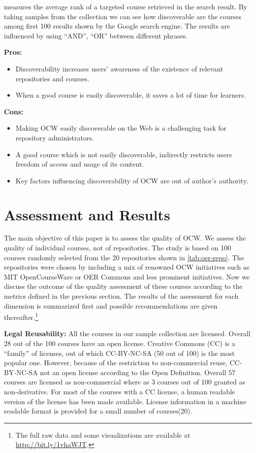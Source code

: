 \documentclass{sig-alternate}
\theoremstyle{definition}
\begin{document}
 measures the average rank of a targeted course retrieved in the search result.
By taking samples from the collection we can see how discoverable are the courses among first 100 results shown by the Google search engine.
The results are influenced by using ``AND'', ``OR'' between different phrases.

\noindent\textbf{Pros:}
\begin{itemize}
\item Discoverability increases users' awareness of the existence of relevant repositories and courses.
\item When a good course is easily discoverable, it saves a lot of time for learners.
\end{itemize}
\noindent\textbf{Cons:}
\begin{itemize}
\item Making OCW easily discoverable on the Web is a challenging task for repository administrators.
\item A good course which is not easily discoverable, indirectly restricts users freedom of access and usage of its content.
\item Key factors influencing discoverability of OCW are out of author's authority.
\end{itemize}

\noindent\section{Assessment and Results}
\label{sec:assessment-results}
The main objective of this paper is to assess the quality of OCW.
We assess the quality of individual courses, not of repositories.
The study is based on 100 courses randomly selected from the 20 repositories shown in \autoref{tab:oer-repo}.
The repositories were chosen by including a mix of renowned OCW initiatives such as MIT OpenCourseWare or OER Commons and less prominent initiatives.
Now we discuss the outcome of the quality assessment of these courses according to the metrics defined in the previous section.
The results of the assessment for each dimension is summarized first and possible recommendations are given thereafter.\footnote{The full raw data and some visualizations are available at \url{http://bit.ly/1vhaWJT}.}

\noindent\textbf{Legal Reusability:}
All the courses in our sample collection are licensed.
Overall 28 out of the 100 courses have an open license.
Creative Commons (CC) is a ``family'' of licenses, out of which CC-BY-NC-SA (50 out of 100) is the most popular one.
However, because of the restriction to non-commercial reuse, CC-BY-NC-SA not an open license according to the Open Definition.
Overall 57 courses are licensed as non-commercial where as 3 courses out of 100 granted as non-derivative.
For most of the courses with a CC license, a human readable version of the license has been made available. 
License information in a machine readable format is provided for a small number of courses(20).
\end{document}
